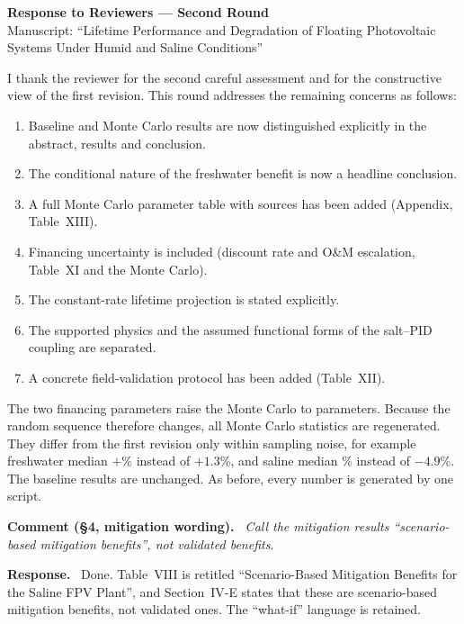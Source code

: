 \documentclass[11pt]{article}
\newcounter{cmt}
\newenvironment{comment}[1]{\refstepcounter{cmt}\par\medskip\noindent\textbf{Comment \thecmt{} (#1).}\itshape\ }{\par}
\newenvironment{response}{\par\noindent\textbf{Response.}\ }{\par}
\begin{document}
\begin{center}
{\Large\bfseries Response to Reviewers --- Second Round}\\[4pt]
Manuscript: ``Lifetime Performance and Degradation of Floating Photovoltaic Systems Under Humid and Saline Conditions''
\end{center}

I thank the reviewer for the second careful assessment and for the constructive view of the first revision. This round
addresses the remaining concerns as follows:
\begin{enumerate}[nosep]
\item Baseline and Monte Carlo results are now distinguished explicitly in the abstract, results and conclusion.
\item The conditional nature of the freshwater benefit is now a headline conclusion.
\item A full Monte Carlo parameter table with sources has been added (Appendix, Table~XIII).
\item Financing uncertainty is included (discount rate and O\&M escalation, Table~XI and the Monte Carlo).
\item The constant-rate lifetime projection is stated explicitly.
\item The supported physics and the assumed functional forms of the salt--PID coupling are separated.
\item A concrete field-validation protocol has been added (Table~XII).
\end{enumerate}
The two financing parameters raise the Monte Carlo to \NParams{} parameters. Because the random sequence therefore
changes, all Monte Carlo statistics are regenerated. They differ from the first revision only within sampling noise, for
example freshwater median $+$\MCLifeMedF\% instead of $+1.3$\%, and saline median \MCLifeMedS\% instead of $-4.9$\%. The
baseline results are unchanged. As before, every number is generated by one script.

\begin{comment}{\S4, mitigation wording}
Call the mitigation results ``scenario-based mitigation benefits'', not validated benefits.
\end{comment}
\begin{response}
Done. Table~VIII is retitled ``Scenario-Based Mitigation Benefits for the Saline FPV Plant'', and Section~IV-E states
that these are scenario-based mitigation benefits, not validated ones. The ``what-if'' language is retained.
\end{response}
\end{document}
